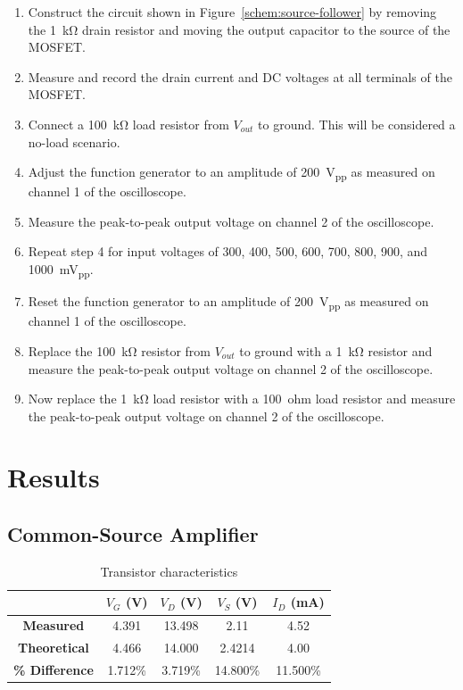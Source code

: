 \begin{enumerate}
\item Construct the circuit shown in Figure~\ref{schem:source-follower} by removing the \SI{1}{\kilo\ohm} drain resistor and moving the output capacitor to the source of the MOSFET.
\item Measure and record the drain current and DC voltages at all terminals of the MOSFET.
\item Connect a \SI{100}{\kilo\ohm} load resistor from $V_{out}$ to ground. This will be considered a no-load scenario.
\item Adjust the function generator to an amplitude of \SI{200}{V_{pp}} as measured on channel 1 of the oscilloscope.
\item Measure the peak-to-peak output voltage on channel 2 of the oscilloscope.
\item Repeat step 4 for input voltages of 300, 400, 500, 600, 700, 800, 900, and \SI{1000}{mV_{pp}}.
\item Reset the function generator to an amplitude of \SI{200}{V_{pp}} as measured on channel 1 of the oscilloscope.
\item Replace the \SI{100}{\kilo\ohm} resistor from $V_{out}$ to ground with a \SI{1}{\kilo\ohm} resistor and measure the peak-to-peak output voltage on channel 2 of the oscilloscope.
\item Now replace the \SI{1}{\kilo\ohm} load resistor with a \SI{100}{ohm} load resistor and measure the peak-to-peak output voltage on channel 2 of the oscilloscope.
\end{enumerate}

\section{Results}

\subsection{Common-Source Amplifier}


\begin{table}[hbtp]
  \centering
  \begin{tabular}{ccccc}
    & $V_{G}$ (\si{V}) & $V_{D}$ (\si{V}) & $V_{S}$ (\si{V}) & $I_D$ (\si{mA}) \\
    \hline
    \textbf{Measured} & 4.391 & 13.498 & 2.11 & 4.52 \\
    \textbf{Theoretical} & 4.466 & 14.000 & 2.4214 & 4.00 \\
    \textbf{\% Difference} & 1.712\% & 3.719\% & 14.800\% & 11.500\% \\
  \end{tabular}
  \caption{\label{tab:tran_common} Transistor characteristics}
\end{table}

